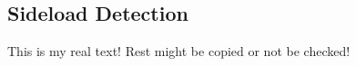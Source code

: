 \subsection{Sideload Detection} \label{subsection:counter-tampering-sideload}
This is my real text! Rest might be copied or not be checked!

